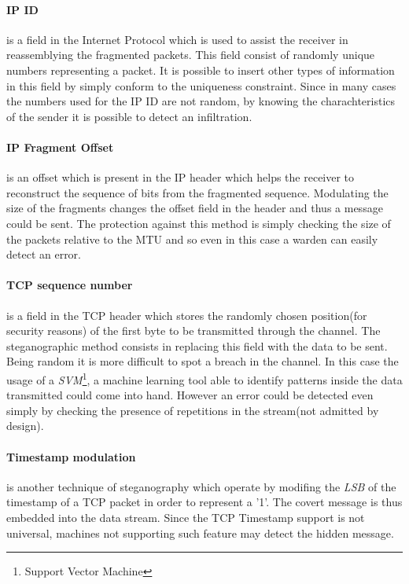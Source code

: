 \documentclass[../../main.tex]{subfiles}
\begin{document}
    \paragraph{IP ID} is a field in the Internet Protocol which is used to
    assist the receiver in reassemblying the fragmented packets.
    This field consist of randomly unique numbers representing a packet.
    It is possible to insert other types of information in this field by simply
    conform to the uniqueness constraint.
    Since in many cases the numbers used for the IP ID are not random, by
    knowing the charachteristics of the sender it is possible to detect an
    infiltration.

    \paragraph{IP Fragment Offset} is an offset which is present in the IP
    header which helps the receiver to reconstruct the sequence of bits from the
    fragmented sequence.
    Modulating the size of the fragments changes the offset field in the header
    and thus a message could be sent.
    The protection against this method is simply checking the size of the
    packets relative to the MTU and so even in this case a warden can easily
    detect an error.

    \paragraph{TCP sequence number} is a field in the TCP header which stores
    the randomly chosen position(for security reasons) of the first byte to be
    transmitted through the channel. The steganographic method consists in
    replacing this field with the data to be sent.
    Being random it is more difficult to spot a breach in the channel.
    In this case the usage of a \emph{SVM}\footnote{Support Vector Machine}, a
    machine learning tool able to identify patterns inside the data transmitted
    could come into hand.
    However an error could be detected even simply by checking the presence of
    repetitions in the stream(not admitted by design). 

    \paragraph{Timestamp modulation} is another technique of steganography which
    operate by modifing the \emph{LSB} of the
    timestamp of a TCP packet in order to represent a '1'.
    The covert message is thus embedded into the data stream.
    Since the TCP Timestamp support is not universal, machines not supporting
    such feature may detect the hidden message.
\end{document}

